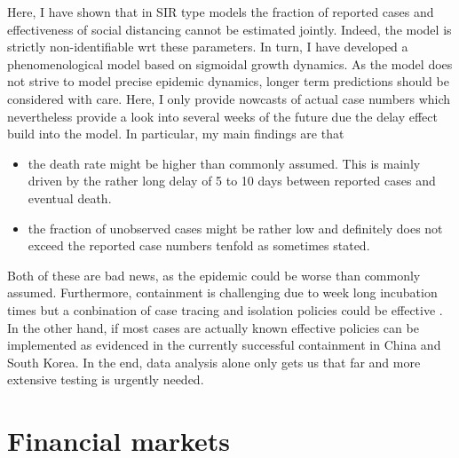 \documentclass[a4paper]{tufte-handout}
\begin{document}
Here, I have shown that in SIR type models the fraction of reported
cases and effectiveness of social distancing cannot be estimated
jointly. Indeed, the model is strictly non-identifiable wrt these
parameters. In turn, I have developed a phenomenological model based
on sigmoidal growth dynamics. As the model does not strive to model
precise epidemic dynamics, longer term predictions should be
considered with care. Here, I only provide nowcasts of actual case
numbers which nevertheless provide a look into several weeks of the
future due the delay effect build into the model. In particular, my
main findings are that
\begin{itemize}
\item the death rate might be higher than commonly assumed. This is
  mainly driven by the rather long delay of 5 to 10 days between
  reported cases and eventual death.
\item the fraction of unobserved cases might be rather low and
  definitely does not exceed the reported case numbers tenfold as
  sometimes stated.
\end{itemize}
Both of these are bad news, as the epidemic could be worse than
commonly assumed. Furthermore, containment is challenging due to week
long incubation times but a conbination of case tracing and isolation
policies could be effective \cite{fraser04}. In the other hand, if
most cases are actually known effective policies can be implemented as
evidenced in the currently successful containment in China and South
Korea. In the end, data analysis alone only gets us that far and more
extensive testing is urgently needed.

\section{Financial markets}
\end{document}

